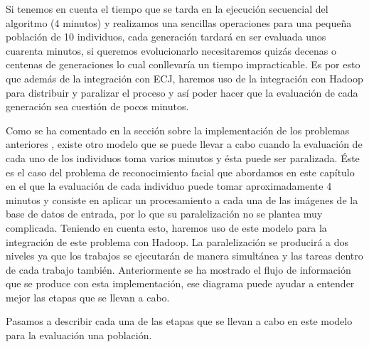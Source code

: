 Si tenemos en cuenta el tiempo que se tarda en la ejecución secuencial del algoritmo (4 minutos) y realizamos una sencillas operaciones para una pequeña población de 10 individuos, cada generación tardar\'a en ser evaluada unos cuarenta minutos, si queremos evolucionarlo necesitaremos quizás decenas o centenas de generaciones lo cual conllevar\'ia un tiempo impracticable. Es por esto que adem\'as de la integración con ECJ, haremos uso de la integración con Hadoop para distribuir y paralizar el proceso y así poder hacer que la evaluación de cada generación sea cuestión de pocos minutos.

Como se ha comentado en la sección sobre la implementación de los problemas anteriores , existe otro modelo que se puede llevar a cabo cuando la evaluación de cada uno de los individuos toma varios minutos y \'esta puede ser paralizada. \'Este es el caso del problema de reconocimiento facial que abordamos en este cap\'itulo en el que la evaluación de cada individuo puede tomar aproximadamente 4 minutos y consiste en aplicar un procesamiento a cada una de las imágenes de la base de datos de entrada, por lo que su paralelizaci\'on no se plantea muy complicada. Teniendo en cuenta esto, haremos uso de este modelo para la integraci\'on de este problema con Hadoop. La paralelizaci\'on se producirá a dos niveles ya que los trabajos se ejecutar\'an de manera simultánea y las tareas dentro de cada trabajo también. Anteriormente  se ha mostrado el flujo de información que se produce con esta implementación, ese diagrama puede ayudar a entender mejor las etapas que se llevan a cabo. 

Pasamos a describir cada una de las etapas que se llevan a cabo en este modelo para la evaluaci\'on una poblaci\'on.

